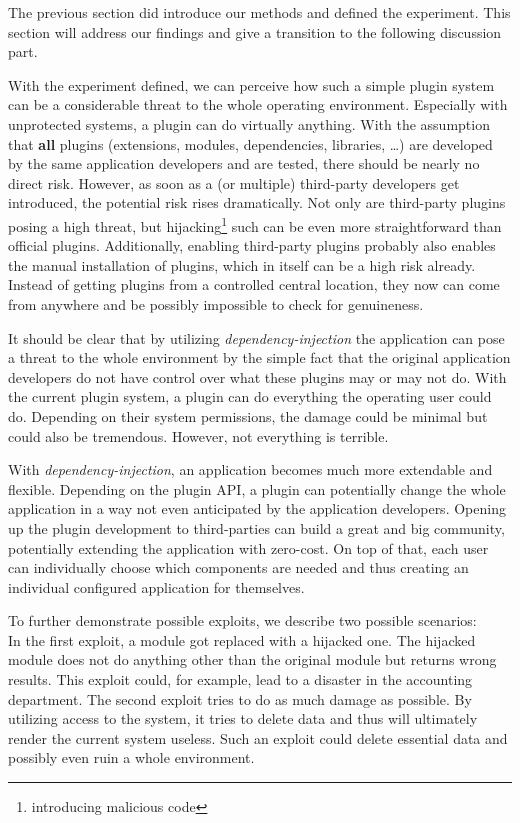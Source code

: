 The previous section did introduce our methods and defined the experiment.
This section will address our findings and give a transition to the following discussion part.

With the experiment defined, we can perceive how such a simple plugin system can be a considerable threat to the whole operating environment.
Especially with unprotected systems, a plugin can do virtually anything.
With the assumption that \textbf{all} plugins (extensions, modules, dependencies, libraries, \dots) are developed by the same application developers and are tested, there should be nearly no direct risk.
However, as soon as a (or multiple) third-party developers get introduced, the potential risk rises dramatically.
Not only are third-party plugins posing a high threat, but hijacking\footnote{introducing malicious code} such can be even more straightforward than official plugins.
Additionally, enabling third-party plugins probably also enables the manual installation of plugins, which in itself can be a high risk already.
Instead of getting plugins from a controlled central location, they now can come from anywhere and be possibly impossible to check for genuineness.

It should be clear that by utilizing  \textit{dependency-injection} the application can pose a threat to the whole environment by the simple fact that the original application developers do not have control over what these plugins may or may not do.
With the current plugin system, a plugin can do everything the operating user could do.
Depending on their system permissions, the damage could be minimal but could also be tremendous.
However, not everything is terrible.

With \textit{dependency-injection}, an application becomes much more extendable and flexible.
Depending on the plugin API, a plugin can potentially change the whole application in a way not even anticipated by the application developers.
Opening up the plugin development to third-parties can build a great and big community, potentially extending the application with zero-cost.
On top of that, each user can individually choose which components are needed and thus creating an individual configured application for themselves.

To further demonstrate possible exploits, we describe two possible scenarios:\\
In the first exploit, a module got replaced with a hijacked one.
The hijacked module does not do anything other than the original module but returns wrong results.
This exploit could, for example, lead to a disaster in the accounting department.
\clearpage
The second exploit tries to do as much damage as possible.
By utilizing access to the system, it tries to delete data and thus will ultimately render the current system useless.
Such an exploit could delete essential data and possibly even ruin a whole environment.

